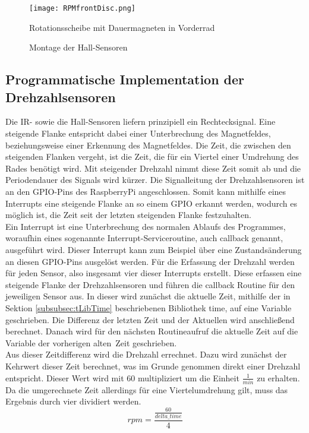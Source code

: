 \begin{figure}[h]
\centering
\texttt{[image: RPMfrontDisc.png]}
\caption{Rotationsscheibe mit Dauermagneten in Vorderrad}
\label{fig:RPMfrontDisc}
\end{figure}

\begin{figure}[h]
\centering
\missingfigure{}
\caption{Montage der Hall-Sensoren}
\label{fig:RPMfrontMount}
\end{figure}

\newpage
\subsection{Programmatische Implementation der Drehzahlsensoren}
\label{subsec:RPMprogram}
Die \ac{IR}- sowie die Hall-Sensoren liefern prinzipiell ein Rechtecksignal. Eine steigende Flanke entspricht dabei einer Unterbrechung des Magnetfeldes, beziehungsweise einer Erkennung des Magnetfeldes. Die Zeit, die zwischen den steigenden Flanken vergeht, ist  die Zeit, die für ein Viertel einer Umdrehung des Rades benötigt wird. Mit steigender Drehzahl nimmt diese Zeit somit ab und die Periodendauer des Signals wird kürzer. Die Signalleitung der Drehzahlsensoren ist an den \ac{GPIO}-Pins des RaspberryPi angeschlossen. Somit kann mithilfe eines Interrupts eine steigende Flanke an so einem \ac{GPIO} erkannt werden, wodurch es möglich ist, die Zeit seit der letzten steigenden Flanke festzuhalten.\\
Ein Interrupt ist eine Unterbrechung des normalen Ablaufs des Programmes, woraufhin eines sogenannte Interrupt-Serviceroutine, auch callback genannt, ausgeführt wird. Dieser Interrupt kann zum Beispiel über eine Zustandsänderung an diesen \ac{GPIO}-Pins ausgelöst werden. Für die Erfassung der Drehzahl werden für jeden Sensor, also insgesamt vier dieser Interrupts erstellt. Diese erfassen eine steigende Flanke der Drehzahlsensoren und führen die callback Routine für den jeweiligen Sensor aus. In dieser wird zunächst die aktuelle Zeit, mithilfe der in Sektion \ref{subsubsec:tLibTime} beschriebenen Bibliothek time, auf eine Variable geschrieben. Die Differenz der letzten Zeit und der Aktuellen wird anschließend berechnet. Danach wird für den nächsten Routineaufruf die aktuelle Zeit auf die Variable der vorherigen \glqq alten\grqq\ Zeit geschrieben.\\
Aus dieser Zeitdifferenz wird die Drehzahl errechnet. Dazu wird zunächst der Kehrwert dieser Zeit berechnet, was im Grunde genommen direkt einer Drehzahl entspricht. Dieser Wert wird mit 60 multipliziert um die Einheit $\frac{1}{min}$ zu erhalten. Da die umgerechnete Zeit allerdings für eine Viertelumdrehung gilt, muss das Ergebnis durch vier dividiert werden.
\begin{equation}
rpm=\frac{\frac{60}{delta\_time}}{4}
\label{eqn:rpm}
\end{equation}

